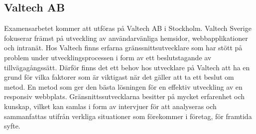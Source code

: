 \documentclass[11pt]{article}
\begin{document}
\subsection{Valtech AB}
Examensarbetet kommer att utföras på Valtech AB i Stockholm. Valtech Sverige fokuserar främst på utveckling av användarvänliga hemsidor, webbapplikationer och intranät. Hos Valtech finns erfarna gränssnittsutvecklare som har stött på problem under utvecklingsprocessen i form av ett beslutstagande av tillvägagångssätt. Därför finns det ett behov hos utvecklare på Valtech att ha en grund för vilka faktorer som är viktigast när det gäller att ta ett beslut om metod. En metod som ger den bästa lösningen för en effektiv utveckling av en responsiv webbplats. Gränsnittssutvecklarna besitter på mycket erfarenhet och kunskap, vilket kan samlas i form av intervjuer för att analyseras och sammanfattas utifrån verkliga situationer som förekommer i företag, för framtida syfte.
\end{document}
